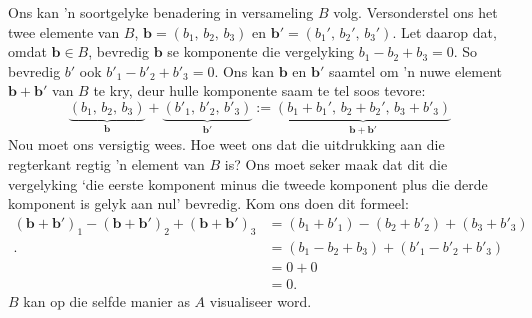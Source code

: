 \documentclass[a4paper,11pt]{book}
\theoremstyle{definition}
\newcommand{\be}{\begin{equation}}
\newcommand{\ee}{\end{equation}}
\newcommand{\ve}[1]{\mathbf{#1}}
\begin{document}
Ons kan 'n soortgelyke benadering in versameling $B$ volg. Versonderstel
ons het twee elemente van $B$, $\ve{b} = (b_1, \,b_2, \,b_3)$ en $\ve{b}'
= (b_1', \, b_2', \, b_3')$. Let daarop dat, omdat $\ve{b}\in B$, bevredig
$\ve{b}$ se komponente die vergelyking $b_1 - b_2 + b_3 = 0$. So bevredig
$b'$ ook $b'_1 - b'_2 + b'_3 = 0$. Ons kan $\ve{b}$ en $\ve{b}'$ saamtel om
'n nuwe element $\ve{b} + \ve{b}'$ van $B$ te kry, deur hulle komponente
saam te tel soos tevore:
\be \label{new_add_in_B}
\underbrace{(b_1, \, b_2, \, b_3)}_{\ve{b}} + \underbrace{(b'_1, \,b'_2, \,
b'_3)}_{\ve{b}'} := \underbrace{(b_1 + b_1', \, b_2 + b_2', \, b_3 +
b'_3)}_{\ve{b} + \ve{b}'}
\ee
Nou moet ons versigtig wees. Hoe weet ons dat die uitdrukking aan die
regterkant regtig 'n element van $B$ is? Ons moet seker maak dat dit die
vergelyking `die eerste komponent minus die tweede komponent plus die derde
komponent is gelyk aan nul' bevredig. Kom ons doen dit formeel:
\begin{align*}
	(\ve{b} + \ve{b}')_1 - (\ve{b}+\ve{b}')_2 + (\ve{b}+\ve{b}')_3 &= (b_1
	+ b'_1) - (b_2 + b'_2) + (b_3 + b'_3) \\.
	&= (b_1 - b_2 + b_3) + (b'_1 - b'_2 + b'_3) \\
	&= 0 + 0 \\
	&= 0.
\end{align*}
$B$ kan op die selfde manier as $A$ visualiseer word.
\end{document}
